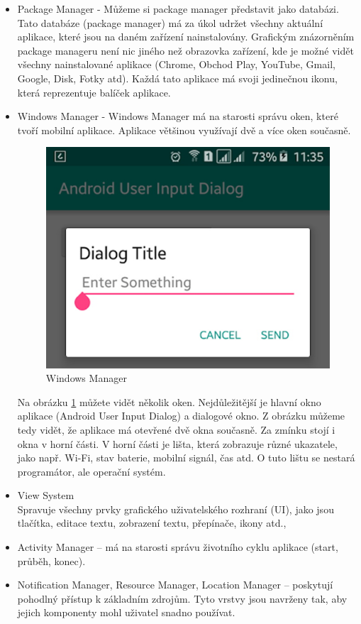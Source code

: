 \documentclass{vskpou} %
\begin{document}
\begin{itemize}
    \item Package Manager - 
    Můžeme si package manager představit jako databázi. Tato databáze (package manager) má za úkol udržet všechny aktuální aplikace, které jsou na daném zařízení nainstalovány. Grafickým znázorněním package manageru není nic jiného než obrazovka zařízení, kde je možné vidět všechny nainstalované aplikace (Chrome, Obchod Play, YouTube, Gmail, Google, Disk, Fotky atd). Každá tato aplikace má svoji jedinečnou ikonu, která reprezentuje balíček aplikace.\cite{17}
    
    \item Windows Manager - Windows Manager má na starosti správu oken, které tvoří mobilní aplikace. Aplikace většinou využívají dvě a více oken současně.
    \begin{figure}[h!]
\centering
\includegraphics[scale=0.5]{images/4.jpg}
\caption{Windows Manager}
\label{4}
\end{figure}

Na obrázku \ref{4} můžete vidět několik oken. Nejdůležitější je hlavní okno aplikace (Android User Input Dialog) a dialogové okno. Z obrázku můžeme tedy vidět, že aplikace má otevřené dvě okna současně. Za zmínku stojí i okna v horní části. V horní části je lišta, která zobrazuje různé ukazatele, jako např. Wi-Fi, stav baterie, mobilní signál, čas atd. O tuto lištu se nestará programátor, ale operační systém.\cite{17}
\end{itemize}

\begin{itemize}
    \item View System\\ 
    Spravuje všechny prvky grafického uživatelského rozhraní (UI), jako jsou tlačítka, editace textu, zobrazení textu, přepínače, ikony atd.\cite{17},\cite{18}
    \item Activity Manager – má na starosti správu životního cyklu aplikace (start, průběh, konec).
    \item Notification Manager, Resource Manager, Location Manager – poskytují pohodlný přístup k základním zdrojům. Tyto vrstvy jsou navrženy tak, aby jejich komponenty mohl uživatel snadno používat.\cite{17}
\end{itemize}
\end{document}
